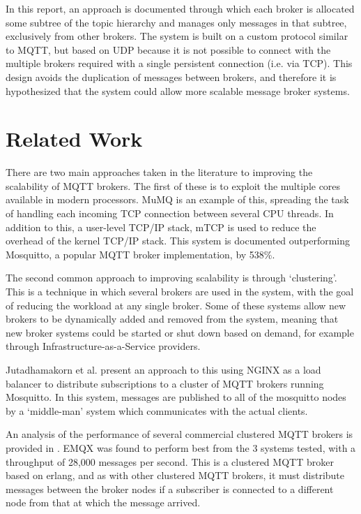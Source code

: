 \documentclass[conference, a4paper]{IEEEtran}
\begin{document}
        In this report, an approach is documented through which each broker is allocated some subtree of the topic hierarchy and manages only messages in that subtree, exclusively from other brokers.
        The system is built on a custom protocol similar to MQTT, but based on UDP because it is not possible to connect with the multiple brokers required with a single persistent connection (i.e. via TCP).
        This design avoids the duplication of messages between brokers, and therefore it is hypothesized that the system could allow more scalable message broker systems.

    \section{Related Work}
        There are two main approaches taken in the literature to improving the scalability of MQTT brokers.
        The first of these is to exploit the multiple cores available in modern processors.
        MuMQ\autocite{wiriyang17} is an example of this, spreading the task of handling each incoming TCP connection between several CPU threads.
        In addition to this, a user-level TCP/IP stack, mTCP is used to reduce the overhead of the kernel TCP/IP stack.
        This system is documented outperforming Mosquitto, a popular MQTT broker implementation, by 538\%.

        
        The second common approach to improving scalability is through `clustering'.
        This is a technique in which several brokers are used in the system, with the goal of reducing the workload at any single broker.
        Some of these systems allow new brokers to be dynamically added and removed from the system, meaning that new broker systems could be started or shut down based on demand, for example through Infrastructure-as-a-Service providers\autocite{koziolek20}.


        Jutadhamakorn et al.\autocite{jutadhamakorn17} present an approach to this using NGINX as a load balancer to distribute subscriptions to a cluster of MQTT brokers running Mosquitto\autocite{mosquitto}.
        In this system, messages are published to all of the mosquitto nodes by a `middle-man' system which communicates with the actual clients.

        
        An analysis of the performance of several commercial clustered MQTT brokers is provided in \autocite{koziolek20}.
        EMQX\autocite{emqx} was found to perform best from the 3 systems tested, with a throughput of 28,000 messages per second.
        This is a clustered MQTT broker based on erlang, and as with other clustered MQTT brokers, it must distribute messages between the broker nodes if a subscriber is connected to a different node from that at which the message arrived.
\end{document}
